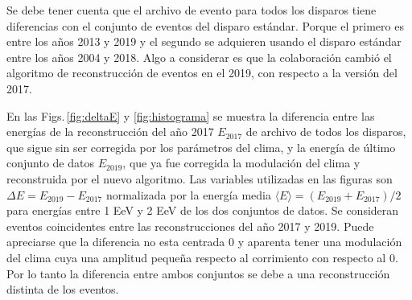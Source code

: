    Se debe tener cuenta que el archivo de evento para todos los disparos tiene diferencias con el conjunto de eventos del disparo estándar. Porque el primero es entre los años 2013 y 2019 y el segundo se adquieren usando el disparo estándar entre los años 2004 y 2018.  Algo a considerar es que la colaboración cambió el algoritmo de reconstrucción de eventos en el 2019, con respecto a la versión del 2017.  

    En las  Figs.\,\ref{fig:deltaE} y \ref{fig:histograma} se muestra la diferencia entre las energías de la reconstrucción del año 2017 $E_{2017}$ de archivo de todos los disparos, que sigue sin ser corregida por los parámetros del clima, y la energía de último conjunto de datos $E_{2019}$, que ya fue corregida la modulación del clima y reconstruida por el nuevo algoritmo. Las variables utilizadas en las figuras son $\Delta E = E_{2019} - E_{2017}$ normalizada por la energía media $\langle E \rangle= (E_{2019} +  E_{2017})/2 $ para energías entre 1 EeV y 2 EeV de los dos conjuntos de datos. Se consideran eventos coincidentes entre las reconstrucciones del año 2017 y 2019. Puede apreciarse que la diferencia no esta centrada 0 y aparenta tener una modulación del clima cuya una amplitud pequeña respecto al corrimiento con respecto al 0. Por lo tanto la diferencia entre ambos conjuntos se debe a una reconstrucción distinta de los eventos. 

